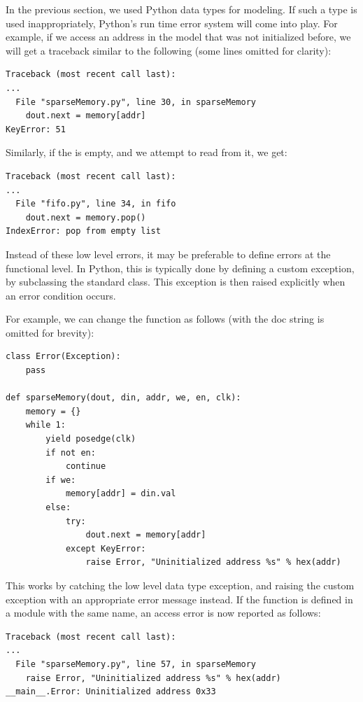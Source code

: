 In the previous section, we used Python data types for modeling. If
such a type is used inappropriately, Python's run time error system
will come into play. For example, if we access an address in the
 model that was not initialized before, we will
get a traceback similar to the following (some lines omitted for
clarity):

\begin{verbatim}
Traceback (most recent call last):
...
  File "sparseMemory.py", line 30, in sparseMemory
    dout.next = memory[addr]
KeyError: 51
\end{verbatim}

Similarly, if the  is empty, and we attempt to read from
it, we get:

\begin{verbatim}
Traceback (most recent call last):
...
  File "fifo.py", line 34, in fifo
    dout.next = memory.pop()
IndexError: pop from empty list
\end{verbatim}

Instead of these low level errors, it may be preferable to define
errors at the functional level. In Python, this is typically done by
defining a custom  exception, by subclassing the standard
 class. This exception is then raised explicitly when
an error condition occurs.

For example, we can change the  function as
follows (with the doc string is omitted for brevity):

\begin{verbatim}
class Error(Exception):
    pass

def sparseMemory(dout, din, addr, we, en, clk):
    memory = {}
    while 1:
        yield posedge(clk)
        if not en:
            continue
        if we:
            memory[addr] = din.val
        else:
            try:
                dout.next = memory[addr]
            except KeyError:
                raise Error, "Uninitialized address %s" % hex(addr)
\end{verbatim}

This works by catching the low level data type exception, and raising
the custom exception with an appropriate error message instead.  If
the  function is defined in a module with the
same name, an access error is now reported as follows:

\begin{verbatim}
Traceback (most recent call last):
...
  File "sparseMemory.py", line 57, in sparseMemory
    raise Error, "Uninitialized address %s" % hex(addr)
__main__.Error: Uninitialized address 0x33
\end{verbatim}

